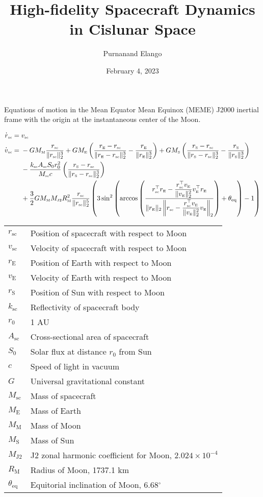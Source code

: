 \documentclass[12pt,letterpaper]{article}
\title{High-fidelity Spacecraft Dynamics in Cislunar Space}
\author{Purnanand Elango}
\date{February 4, 2023}
\renewcommand{\dot}[1]{\overset{\text{{\large .}}}{#1}}
\newcommand{\rsc}{r_{\scriptscriptstyle\text{sc}}}
\newcommand{\vsc}{v_{\scriptscriptstyle\text{sc}}}
\newcommand{\drsc}{\dot{r}_{\scriptscriptstyle\text{sc}}}
\newcommand{\dvsc}{\dot{v}_{\scriptscriptstyle\text{sc}}}
\newcommand{\rE}{r_{\scriptscriptstyle\text{E}}}
\newcommand{\rS}{r_{\scriptscriptstyle \text{S}}}
\newcommand{\vE}{v_{\scriptscriptstyle \text{E}}}
\newcommand{\ME}{M_{\scriptscriptstyle \text{E}}}
\newcommand{\MM}{M_{\scriptscriptstyle \text{M}}}
\newcommand{\MS}{M_{\scriptscriptstyle \text{S}}}
\newcommand{\RM}{R_{\scriptscriptstyle \text{M}}}
\newcommand{\MJtwo}{M_{\scriptscriptstyle \text{J2}}}
\newcommand{\thteq}{\theta_{\text{eq}}}
\newcommand{\ksc}{k_{\scriptscriptstyle\text{sc}}}
\newcommand{\Msc}{M_{\scriptscriptstyle\text{sc}}}
\newcommand{\Asc}{A_{\scriptscriptstyle\text{sc}}}
\begin{document}
\maketitle

Equations of motion in the Mean Equator Mean Equinox (MEME) J2000 inertial frame with the origin at the instantaneous center of the Moon.  

\begin{subequations}
\begin{align}
    \drsc ={} &\vsc\\
    \dvsc ={} & \displaystyle-G\MM \frac{\rsc}{\|\rsc\|_2^3} + G\ME\left( \frac{\rE - \rsc}{\| \rE - \rsc \|_2^3} - \frac{\rE}{\|\rE\|_2^3}\right) + G\MS\left( \frac{\rS - \rsc}{\| \rS - \rsc \|_2^3} - \frac{\rS}{\|\rS\|_2^3}\right) \nonumber \\
     & - \frac{\ksc\Asc S_0r_0^2}{\Msc c} \left( \frac{\rS - \rsc}{\| \rS - \rsc \|_2^3} \right)\\
     & + \frac{3}{2}G\MM\MJtwo\RM^2\frac{\rsc}{\|\rsc\|_2^5}\left( 3\sin^2 \left( \arccos\left(\frac{\rsc^\top\rE - \displaystyle \frac{\rsc^\top\vE}{\|\vE\|^2_2}\vE^\top\rE}{\|\rE\|_2\left\| \rsc - \displaystyle \frac{\rsc^\top\vE}{\|\vE\|^2_2}\vE \right\|_2}\right)+\thteq\right) - 1 \right)\nonumber
\end{align}    
\end{subequations}

\begin{table}[!htpb]
\centering
\begin{tabular}{l|l}
\hline
 $\rsc$ & Position of spacecraft with respect to Moon\\   
 $\vsc$ & Velocity of spacecraft with respect to Moon\\
 $\rE$  & Position of Earth with respect to Moon\\
 $\vE$  & Velocity of Earth with respect to Moon\\
 $\rS$  & Position of Sun with respect to Moon\\
 $\ksc$ & Reflectivity of spacecraft body\\ 
 $r_0$  & 1 AU\\
 $\Asc$ & Cross-sectional area of spacecraft\\   
 $S_0$  & Solar flux at distance $r_0$ from Sun\\
 $c$    & Speed of light in vacuum\\
 $G$    & Universal gravitational constant\\
 $\Msc$ & Mass of spacecraft\\
 $\ME$  & Mass of Earth\\
 $\MM$  & Mass of Moon\\
 $\MS$  & Mass of Sun\\
 $\MJtwo$ & J2 zonal harmonic coefficient for Moon, $2.024\times 10^{-4}$\\
 $\RM$    & Radius of Moon, 1737.1 km\\
 $\thteq$ & Equitorial inclination of Moon, 6.68$^\circ$\\
\hline
\end{tabular}
\end{table}
\end{document}
